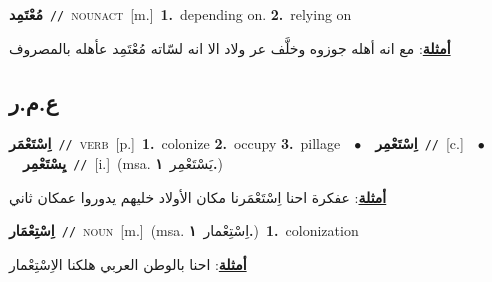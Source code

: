 \documentclass[10pt,a4paper,twoside]{article} %
\begin{document}
\begin{multicols}{2}
{\setlength\topsep{0pt}\textbf{\foreignlanguage{arabic}{مُعْتَمِد}}\ {\color{gray}\texttt{//}\color{black}}\ \textsc{noun\textunderscore act}\ [m.]\ \textbf{1.}~depending on.  \textbf{2.}~relying on\  \begin{flushright}\color{gray}\foreignlanguage{arabic}{\textbf{\underline{\foreignlanguage{arabic}{أمثلة}}}: مع انه أهله جوزوه وخلَّف عر ولاد الا انه لسّاته مُعْتَمِد عأهله بالمصروف}\end{flushright}\color{black}} \vspace{2mm}

\vspace{-3mm}
\subsection*{\color{blue}\foreignlanguage{arabic}{ع.م.ر}\color{blue}{}} 

{\setlength\topsep{0pt}\textbf{\foreignlanguage{arabic}{اِسْتَعْمَر}}\ {\color{gray}\texttt{//}\color{black}}\ \textsc{verb}\ [p.]\ \textbf{1.}~colonize  \textbf{2.}~occupy  \textbf{3.}~pillage\ \ $\bullet$\ \ \setlength\topsep{0pt}\textbf{\foreignlanguage{arabic}{اِسْتَعْمِر}}\ {\color{gray}\texttt{//}\color{black}}\ [c.]\ \ $\bullet$\ \ \setlength\topsep{0pt}\textbf{\foreignlanguage{arabic}{يِسْتَعْمِر}}\ {\color{gray}\texttt{//}\color{black}}\ [i.]\ \color{gray}(msa. \foreignlanguage{arabic}{يَسْتَعْمِر}~\foreignlanguage{arabic}{\textbf{١.}})\color{black}\  \begin{flushright}\color{gray}\foreignlanguage{arabic}{\textbf{\underline{\foreignlanguage{arabic}{أمثلة}}}: عفكرة احنا اِسْتَعْمَرنا مكان الأولاد خليهم يدوروا عمكان ثاني}\end{flushright}\color{black}} \vspace{2mm}

{\setlength\topsep{0pt}\textbf{\foreignlanguage{arabic}{اِسْتِعْمَار}}\ {\color{gray}\texttt{//}\color{black}}\ \textsc{noun}\ [m.]\ \color{gray}(msa. \foreignlanguage{arabic}{اِسْتِعْمار}~\foreignlanguage{arabic}{\textbf{١.}})\color{black}\ \textbf{1.}~colonization\  \begin{flushright}\color{gray}\foreignlanguage{arabic}{\textbf{\underline{\foreignlanguage{arabic}{أمثلة}}}: احنا بالوطن العربي هلكنا الاِسْتِعْمار}\end{flushright}\color{black}} \vspace{2mm}


\end{multicols}
\end{document}

